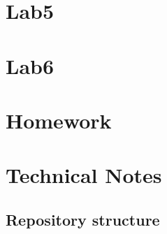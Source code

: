 \documentclass[a4paper,12pt,titlepage]{article} %
\begin{document}
\section{Lab5}

\newpage
\section{Lab6}

\newpage
\section{Homework}
\newpage
\section{Technical Notes}
\subsection{Repository structure}
\end{document}
